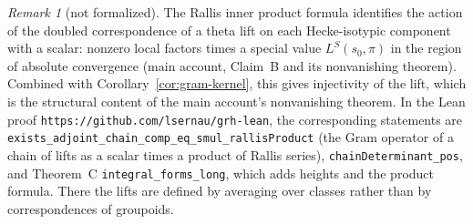 \documentclass[11pt]{amsart}
\theoremstyle{definition}
\theoremstyle{remark}
\newtheorem{remark}[theorem]{Remark}
\begin{document}
\begin{remark}[not formalized]
The Rallis inner product formula identifies the action of the doubled correspondence of a theta lift on each Hecke-isotypic component with a scalar: nonzero local factors times a special value $L^S(s_0,\pi)$ in the region of absolute convergence (main account, Claim~B and its nonvanishing theorem). Combined with Corollary~\ref{cor:gram-kernel}, this gives injectivity of the lift, which is the structural content of the main account's nonvanishing theorem. In the Lean proof \texttt{https://github.com/lsernau/grh-lean}, the corresponding statements are \texttt{exists\_adjoint\_chain\_comp\_eq\_smul\_rallisProduct} (the Gram operator of a chain of lifts as a scalar times a product of Rallis series), \texttt{chainDeterminant\_pos}, and Theorem~C \texttt{integral\_forms\_long}, which adds heights and the product formula. There the lifts are defined by averaging over classes rather than by correspondences of groupoids.
\end{remark}
\end{document}
